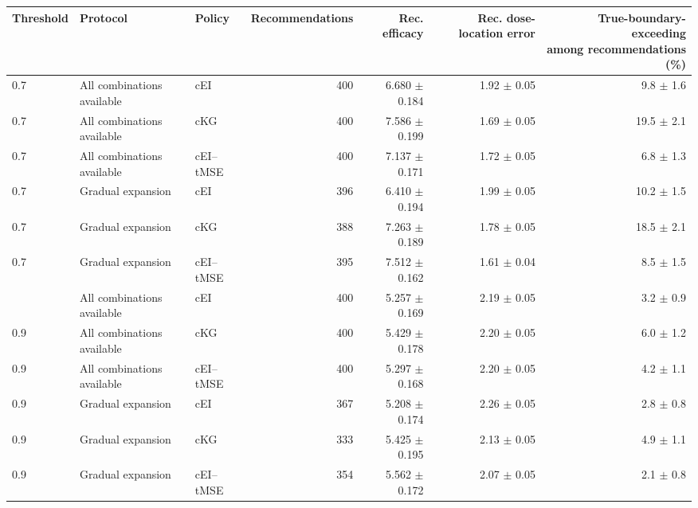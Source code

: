 \begin{tabular}{lllrrrr}
\toprule
Threshold & Protocol & Policy & Recommendations & Rec. efficacy & Rec. dose-location error & \shortstack{True-boundary-exceeding\\among recommendations (\%)} \\
\midrule
0.7 & All combinations available & cEI & 400 & 6.680 $\pm$ 0.184 & 1.92 $\pm$ 0.05 & 9.8 $\pm$ 1.6 \\
0.7 & All combinations available & cKG & 400 & 7.586 $\pm$ 0.199 & 1.69 $\pm$ 0.05 & 19.5 $\pm$ 2.1 \\
0.7 & All combinations available & cEI--tMSE & 400 & 7.137 $\pm$ 0.171 & 1.72 $\pm$ 0.05 & 6.8 $\pm$ 1.3 \\
0.7 & Gradual expansion & cEI & 396 & 6.410 $\pm$ 0.194 & 1.99 $\pm$ 0.05 & 10.2 $\pm$ 1.5 \\
0.7 & Gradual expansion & cKG & 388 & 7.263 $\pm$ 0.189 & 1.78 $\pm$ 0.05 & 18.5 $\pm$ 2.1 \\
0.7 & Gradual expansion & cEI--tMSE & 395 & 7.512 $\pm$ 0.162 & 1.61 $\pm$ 0.04 & 8.5 $\pm$ 1.5 \\
\addlinespace
0.9 & All combinations available & cEI & 400 & 5.257 $\pm$ 0.169 & 2.19 $\pm$ 0.05 & 3.2 $\pm$ 0.9 \\
0.9 & All combinations available & cKG & 400 & 5.429 $\pm$ 0.178 & 2.20 $\pm$ 0.05 & 6.0 $\pm$ 1.2 \\
0.9 & All combinations available & cEI--tMSE & 400 & 5.297 $\pm$ 0.168 & 2.20 $\pm$ 0.05 & 4.2 $\pm$ 1.1 \\
0.9 & Gradual expansion & cEI & 367 & 5.208 $\pm$ 0.174 & 2.26 $\pm$ 0.05 & 2.8 $\pm$ 0.8 \\
0.9 & Gradual expansion & cKG & 333 & 5.425 $\pm$ 0.195 & 2.13 $\pm$ 0.05 & 4.9 $\pm$ 1.1 \\
0.9 & Gradual expansion & cEI--tMSE & 354 & 5.562 $\pm$ 0.172 & 2.07 $\pm$ 0.05 & 2.1 $\pm$ 0.8 \\
\bottomrule
\end{tabular}
